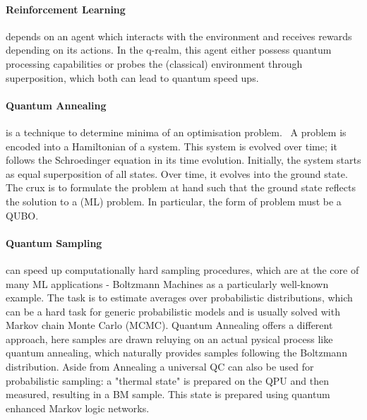 \paragraph{Reinforcement Learning} depends on an agent which interacts with the
environment and receives rewards depending on its actions. In the q-realm, this
agent either possess quantum processing capabilities or probes the (classical)
environment through superposition, which both can lead to quantum speed ups. 

\paragraph{Quantum Annealing}  is a technique to determine minima of an
optimisation problem.   A problem is encoded into a Hamiltonian of a system.
This system is evolved over time; it follows the Schroedinger equation in its
time evolution. Initially, the system starts as equal superposition of all
states. Over time, it evolves into the ground state. The crux is to formulate
the problem at hand such that the ground state reflects the solution to a (ML)
problem. In particular, the form of problem must be a QUBO. 

\paragraph{Quantum Sampling} can speed up computationally hard sampling
procedures, which are at the core of many ML applications - Boltzmann Machines
as a particularly well-known example. The task is to estimate averages over
probabilistic distributions, which can be a hard task for generic probabilistic
models and is usually solved with Markov chain Monte Carlo (MCMC). Quantum
Annealing offers a different approach, here samples are drawn reluying on an
actual pysical process like quantum annealing, which naturally provides samples
following the Boltzmann distribution. 
Aside from Annealing a universal QC can also be used for probabilistic sampling:
a "thermal state" is prepared on the QPU and then measured, resulting in a BM
sample. This state is prepared using quantum enhanced Markov logic networks.

